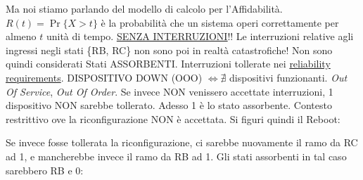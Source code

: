 \begin{center}
\end{center} 

Ma noi stiamo parlando del modello di calcolo per l'Affidabilità. $R(t) = \Pr\{X > t\}$ è la probabilità che un sistema operi correttamente per almeno $t$ unità di tempo. \newline\underline{\underline{SENZA INTERRUZIONI}}!! Le interruzioni relative agli ingressi negli stati \{RB, RC\} non sono poi in realtà catastrofiche! Non sono quindi considerati Stati ASSORBENTI. Interruzioni tollerate nei \underline{reliability requirements}. DISPOSITIVO DOWN (OOO) $\iff \nexists$ dispositivi funzionanti. \textit{Out Of Service}, \textit{Out Of Order}. Se invece NON venissero accettate interruzioni, 1 dispositivo NON sarebbe tollerato. Adesso 1 è lo stato assorbente. Contesto restrittivo ove la riconfigurazione NON è accettata. Si figuri quindi il Reboot:

\begin{center}
\end{center}

 Se invece fosse tollerata la riconfigurazione, ci sarebbe nuovamente il ramo da RC ad 1, e mancherebbe invece il ramo da RB ad 1. Gli stati assorbenti in tal caso sarebbero RB e 0:
 
